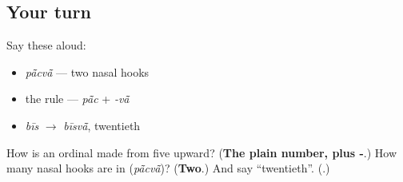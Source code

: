 \subsection*{Your turn}
Say these aloud:

\begin{itemize}
\raggedright
  \item \emph{pā̃cvā̃} — two nasal hooks
  \item the rule — \emph{pā̃c} + \emph{-vā̃}
  \item \emph{bīs} $\to$ \emph{bīsvā̃}, twentieth
\end{itemize}

\begin{tcolorbox}[breakable,colback=teal!4,colframe=teal!35!black,title={Before you move on}]
How is an ordinal made from five upward? (\textbf{The plain number, plus -}.) How many nasal hooks are in \textbf{} (\emph{pā̃cvā̃})? (\textbf{Two}.) And say \textquotedblleft{}twentieth\textquotedblright{}. (\textbf{}.)
\end{tcolorbox}

